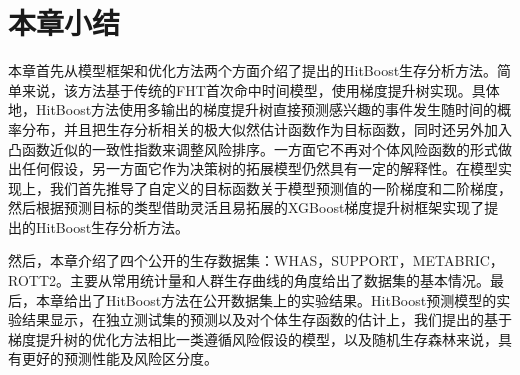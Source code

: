 \section{本章小结}

本章首先从模型框架和优化方法两个方面介绍了提出的HitBoost生存分析方法。简单来说，该方法基于传统的FHT首次命中时间模型，使用梯度提升树实现。具体地，HitBoost方法使用多输出的梯度提升树直接预测感兴趣的事件发生随时间的概率分布，并且把生存分析相关的极大似然估计函数作为目标函数，同时还另外加入凸函数近似的一致性指数来调整风险排序。一方面它不再对个体风险函数的形式做出任何假设，另一方面它作为决策树的拓展模型仍然具有一定的解释性。在模型实现上，我们首先推导了自定义的目标函数关于模型预测值的一阶梯度和二阶梯度，然后根据预测目标的类型借助灵活且易拓展的XGBoost梯度提升树框架实现了提出的HitBoost生存分析方法。

然后，本章介绍了四个公开的生存数据集：WHAS，SUPPORT，METABRIC，ROTT2。主要从常用统计量和人群生存曲线的角度给出了数据集的基本情况。最后，本章给出了HitBoost方法在公开数据集上的实验结果。HitBoost预测模型的实验结果显示，在独立测试集的预测以及对个体生存函数的估计上，我们提出的基于梯度提升树的优化方法相比一类遵循风险假设的模型，以及随机生存森林来说，具有更好的预测性能及风险区分度。

